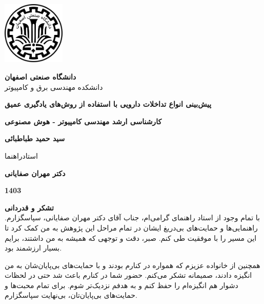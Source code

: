 \thispagestyle{empty}
\begin{center}
\includegraphics[height=3cm]{iut_logo.png}
\vspace{0.4cm}

{\large
	\textbf{دانشگاه صنعتی اصفهان}\\
	دانشکده مهندسی برق و کامپیوتر
}
\vspace{3.5cm}

{\LARGE
	\textbf{پیش‌بینی انواع تداخلات دارویی با استفاده از روش‌های یادگیری عمیق}\\
}
\vspace{3.5cm}

{\large
	\textbf{کارشناسی ارشد مهندسی کامپیوتر - هوش مصنوعی}\\
}
\vspace{1cm}

{\Large
	\textbf{سید حمید طباطبائی}\\
}
\vspace{2.5cm}

{\large
	استادراهنما\\
}
\vspace{0.5cm}

{\Large
	\textbf{دکتر مهران صفایانی}\\
}
\vspace{3.5cm}

{\Large
	\textbf{1403}
}

\end{center}
\restoregeometry
\pagebreak

\thispagestyle{empty}
\vspace*{1.5cm}

{\large
	\textbf{تشکر و قدردانی}\\
	
	
	با تمام وجود از استاد راهنمای گرامی‌ام، جناب آقای دکتر مهران صفایانی، سپاسگزارم. راهنمایی‌ها و حمایت‌های بی‌دریغ ایشان در تمام مراحل این پژوهش به من کمک کرد تا این مسیر را با موفقیت طی کنم. صبر، دقت و توجهی که همیشه به من داشتند، برایم بسیار ارزشمند بود.
	
	همچنین از خانواده عزیزم که همواره در کنارم بودند و با حمایت‌های بی‌پایان‌شان به من انگیزه دادند، صمیمانه تشکر می‌کنم. حضور شما در کنارم باعث شد حتی در لحظات دشوار هم انگیزه‌ام را حفظ کنم و به هدفم نزدیک‌تر شوم. برای تمام محبت‌ها و حمایت‌های بی‌پایان‌تان، بی‌نهایت سپاسگزارم.
	
}
\restoregeometry
\pagebreak

